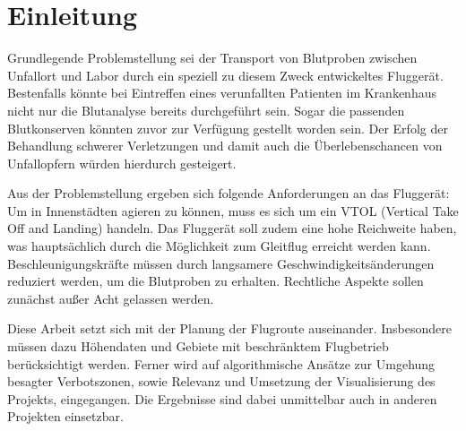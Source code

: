 \section*{Einleitung}
Grundlegende Problemstellung sei der Transport von Blutproben zwischen Unfallort und Labor durch ein speziell zu diesem Zweck entwickeltes Fluggerät.
Bestenfalls könnte bei Eintreffen eines verunfallten Patienten im Krankenhaus nicht nur die Blutanalyse bereits durchgeführt sein.
Sogar die passenden Blutkonserven könnten zuvor zur Verfügung gestellt worden sein.
Der Erfolg der Behandlung schwerer Verletzungen und damit auch die Überlebenschancen von Unfallopfern würden hierdurch gesteigert.

Aus der Problemstellung ergeben sich folgende Anforderungen an das Fluggerät:
Um in Innenstädten agieren zu können, muss es sich um ein VTOL (Vertical Take Off and Landing) handeln.
Das Fluggerät soll zudem eine hohe Reichweite haben, was hauptsächlich durch die Möglichkeit zum Gleitflug erreicht werden kann.
Beschleunigungskräfte müssen durch langsamere Geschwindigkeitsänderungen reduziert werden, um die Blutproben zu erhalten.
Rechtliche Aspekte sollen zunächst außer Acht gelassen werden.

Diese Arbeit setzt sich mit der Planung der Flugroute auseinander.
Insbesondere müssen dazu Höhendaten und Gebiete mit beschränktem Flugbetrieb berücksichtigt werden.
Ferner wird auf algorithmische Ansätze zur Umgehung besagter Verbotszonen, sowie Relevanz und Umsetzung der Visualisierung des Projekts, eingegangen.
Die Ergebnisse sind dabei unmittelbar auch in anderen Projekten einsetzbar.




